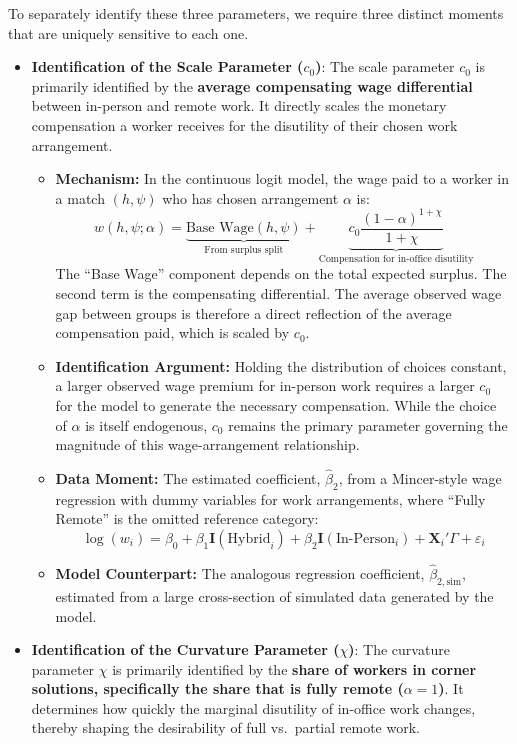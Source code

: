 \documentclass[
  11pt,
  letterpaper,
  DIV=11,
  numbers=noendperiod]{scrartcl}
\providecommand{\tightlist}{%
  \setlength{\itemsep}{0pt}\setlength{\parskip}{0pt}}\usepackage{longtable,booktabs,array}
\begin{document}
To separately identify these three parameters, we require three distinct
moments that are uniquely sensitive to each one.

\begin{itemize}
\tightlist
\item
  \textbf{Identification of the Scale Parameter (\(c_{0}\))}: The scale
  parameter \(c_{0}\) is primarily identified by the \textbf{average
  compensating wage differential} between in-person and remote work. It
  directly scales the monetary compensation a worker receives for the
  disutility of their chosen work arrangement.

  \begin{itemize}
  \tightlist
  \item
    \textbf{Mechanism:} In the continuous logit model, the wage paid to
    a worker in a match \((h, \psi)\) who has chosen arrangement
    \(\alpha\) is:
    \[w(h, \psi; \alpha) = \underbrace{\text{Base Wage}(h, \psi)}_{\text{From surplus split}} + \underbrace{c_{0} \frac{(1-\alpha)^{1+\chi}}{1+\chi}}_{\text{Compensation for in-office disutility}}\]
    The ``Base Wage'' component depends on the total expected surplus.
    The second term is the compensating differential. The average
    observed wage gap between groups is therefore a direct reflection of
    the average compensation paid, which is scaled by \(c_{0}\).
  \item
    \textbf{Identification Argument:} Holding the distribution of
    choices constant, a larger observed wage premium for in-person work
    requires a larger \(c_{0}\) for the model to generate the necessary
    compensation. While the choice of \(\alpha\) is itself endogenous,
    \(c_{0}\) remains the primary parameter governing the magnitude of
    this wage-arrangement relationship.
  \item
    \textbf{Data Moment:} The estimated coefficient, \(\hat{\beta}_2\),
    from a Mincer-style wage regression with dummy variables for work
    arrangements, where ``Fully Remote'' is the omitted reference
    category:
    \[\log(w_i) = \beta_0 + \beta_1 \mathbf{I}(\text{Hybrid}_i) + \beta_2 \mathbf{I}(\text{In-Person}_i) + \mathbf{X}_i'\Gamma + \varepsilon_i\]
  \item
    \textbf{Model Counterpart:} The analogous regression coefficient,
    \(\hat{\beta}_{2, \text{sim}}\), estimated from a large
    cross-section of simulated data generated by the model.
  \end{itemize}
\item
  \textbf{Identification of the Curvature Parameter (\(\chi\))}: The
  curvature parameter \(\chi\) is primarily identified by the
  \textbf{share of workers in corner solutions, specifically the share
  that is fully remote (\(\alpha = 1\))}. It determines how quickly the
  marginal disutility of in-office work changes, thereby shaping the
  desirability of full vs.~partial remote work.


\end{itemize}
\end{document}
